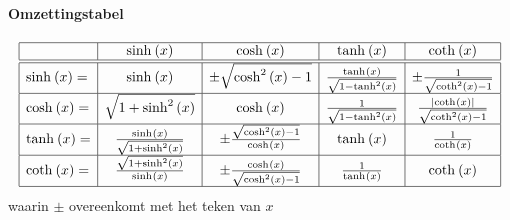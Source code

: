 \paragraph{Omzettingstabel}
\label{sec:OmzettingHyperbolisch}

\newcommand{\FSH}[1]{\sinh^{#1}\left(x\right)}
\newcommand{\FCH}[1]{\cosh^{#1}\left(x\right)}
\newcommand{\FTH}[1]{\tanh^{#1}\left(x\right)}
\newcommand{\FCT}[1]{\coth^{#1}\left(x\right)}
\begin{center}
\[
  \begin{array}{|l|c|c|c|c|}
  \hline    & \FSH{} & \FCH{} & \FTH{} & \FCT{} \\ \hline \hline
                                                             
  \FSH{} =  & \FSH{}%
            & \pm \sqrt{\FCH{2}-1}%
            & \frac{\FTH{}}{\sqrt{1-\FTH{2}}}%
            & \pm \frac{1}{\sqrt{\FCT{2}-1}}%
            \\ \hline %
  \FCH{} =  & \sqrt{1+\FSH{2}}%
            & \FCH{}%
            & \frac{1}{\sqrt{1-\FTH{2}}}%
            & \frac{\abs{\FCT{}}}{\sqrt{\FCT{2}-1}}%
            \\ \hline %
  \FTH{} =  & \frac{\FSH{}}{\sqrt{1+\FSH{2}}}%
            & \pm \frac{\sqrt{\FCH{2}-1}}{\FCH{}}%
            & \FTH{}%
            & \frac{1}{\FCT{}}%
            \\ \hline %
  \FCT{} =  & \frac{\sqrt{1+\FSH{2}}}{\FSH{}}%
            & \pm \frac{\FCH{}}{\sqrt{\FCH{2}-1}}%
            & \frac{1}{\FTH{}}
            & \FCT{}%
            \\ \hline
  \end{array}
\]
waarin $\pm$ overeenkomt met het teken van $x$
\end{center}